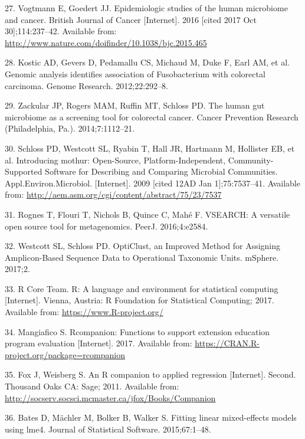 \documentclass[12pt,]{article}
\begin{document}
\hypertarget{ref-vogtmann_epidemiologic_2016}{}
27. Vogtmann E, Goedert JJ. Epidemiologic studies of the human
microbiome and cancer. British Journal of Cancer {[}Internet{]}. 2016
{[}cited 2017 Oct 30{]};114:237--42. Available from:
\url{http://www.nature.com/doifinder/10.1038/bjc.2015.465}

\hypertarget{ref-kostic_genomic_2012}{}
28. Kostic AD, Gevers D, Pedamallu CS, Michaud M, Duke F, Earl AM, et
al. Genomic analysis identifies association of Fusobacterium with
colorectal carcinoma. Genome Research. 2012;22:292--8.

\hypertarget{ref-zackular_human_2014}{}
29. Zackular JP, Rogers MAM, Ruffin MT, Schloss PD. The human gut
microbiome as a screening tool for colorectal cancer. Cancer Prevention
Research (Philadelphia, Pa.). 2014;7:1112--21.

\hypertarget{ref-schloss_introducing_2009}{}
30. Schloss PD, Westcott SL, Ryabin T, Hall JR, Hartmann M, Hollister
EB, et al. Introducing mothur: Open-Source, Platform-Independent,
Community-Supported Software for Describing and Comparing Microbial
Communities. Appl.Environ.Microbiol. {[}Internet{]}. 2009 {[}cited 12AD
Jan 1{]};75:7537--41. Available from:
\url{http://aem.asm.org/cgi/content/abstract/75/23/7537}

\hypertarget{ref-rognes_vsearch_2016}{}
31. Rognes T, Flouri T, Nichols B, Quince C, Mahé F. VSEARCH: A
versatile open source tool for metagenomics. PeerJ. 2016;4:e2584.

\hypertarget{ref-westcott_opticlust_2017}{}
32. Westcott SL, Schloss PD. OptiClust, an Improved Method for Assigning
Amplicon-Based Sequence Data to Operational Taxonomic Units. mSphere.
2017;2.

\hypertarget{ref-r_citation_2017}{}
33. R Core Team. R: A language and environment for statistical computing
{[}Internet{]}. Vienna, Austria: R Foundation for Statistical Computing;
2017. Available from: \url{https://www.R-project.org/}

\hypertarget{ref-rcompanion_citation_2017}{}
34. Mangiafico S. Rcompanion: Functions to support extension education
program evaluation {[}Internet{]}. 2017. Available from:
\url{https://CRAN.R-project.org/package=rcompanion}

\hypertarget{ref-car_citation_2011}{}
35. Fox J, Weisberg S. An R companion to applied regression
{[}Internet{]}. Second. Thousand Oaks CA: Sage; 2011. Available from:
\url{http://socserv.socsci.mcmaster.ca/jfox/Books/Companion}

\hypertarget{ref-lme4_citation_2015}{}
36. Bates D, Mächler M, Bolker B, Walker S. Fitting linear mixed-effects
models using lme4. Journal of Statistical Software. 2015;67:1--48.
\end{document}
